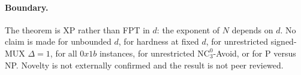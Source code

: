 \documentclass[11pt]{article}
\begin{document}
\paragraph{Boundary.}
The theorem is XP rather than FPT in $d$: the exponent of $N$ depends on $d$.  No claim is made for unbounded $d$, for hardness at fixed $d$, for unrestricted signed-MUX $\Delta=1$, for all $0x1b$ instances, for unrestricted $\mathrm{NC}^0_3$-Avoid, or for P versus NP.  Novelty is not externally confirmed and the result is not peer reviewed.
\end{document}
